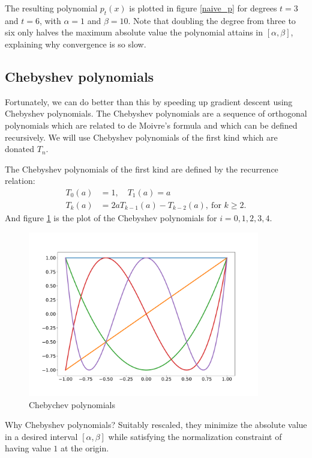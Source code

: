 The resulting polynomial $p_t(x)$ is plotted in figure \ref{naive_p} for degrees $t = 3$ and $t = 6$, with $\alpha = 1$ and $\beta = 10$. Note that doubling the degree from three to six only halves the maximum absolute value the polynomial attains in $[\alpha,\beta]$, explaining why convergence is so slow.


\subsection{Chebyshev polynomials}

Fortunately, we can do better than this by speeding up gradient descent using Chebyshev polynomials. The Chebyshev polynomials are a sequence of orthogonal polynomials which are related to de Moivre's formula and which can be defined recursively. We will use Chebyshev polynomials of the first kind which are donated $T_n$.

The Chebyshev polynomials of the first kind are defined by the recurrence relation:
\begin{align*}
T_0(a) &= 1,\quad T_1(a) = a \\
T_k(a) &= 2a T_{k-1}(a) - T_{k-2}(a),\ \text{for }k \geq 2.
\end{align*}
And figure \ref{chebychev_poly} is the plot of the Chebyshev polynomials for $i=0, 1, 2, 3, 4$. 

\begin{figure}[ht]
\includegraphics[width=0.9\textwidth]{figures/lecture6-cheb_polynome.pdf}
\centering
\caption{Chebychev polynomials}
\label{chebychev_poly}
\end{figure}

Why Chebyshev polynomials? Suitably rescaled, they minimize the absolute value in a desired interval $[\alpha, \beta]$ while satisfying the normalization constraint of having value $1$ at the origin.

